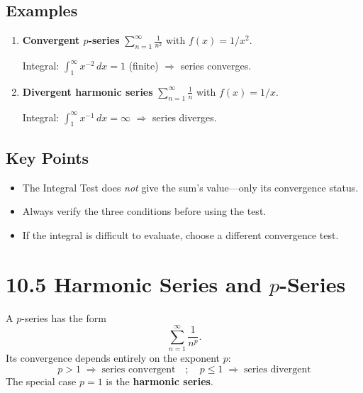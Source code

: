 \documentclass{article}
\begin{document}
\subsection*{Examples}

\begin{enumerate}[label=\textbf{\arabic*.},itemsep=10pt]

  \item \textbf{Convergent \(p\)-series}  
        \(\displaystyle\sum_{n=1}^{\infty}\frac{1}{n^{2}}\)  
        with \(f(x)=1/x^{2}\).

        Integral: \(\displaystyle\int_{1}^{\infty} x^{-2}\,dx = 1\) (finite)  
        \(\Rightarrow\) series converges.

  \item \textbf{Divergent harmonic series}  
        \(\displaystyle\sum_{n=1}^{\infty}\frac{1}{n}\)  
        with \(f(x)=1/x\).

        Integral: \(\displaystyle\int_{1}^{\infty} x^{-1}\,dx = \infty\)  
        \(\Rightarrow\) series diverges.

\end{enumerate}

\subsection*{Key Points}
\begin{itemize}[itemsep=4pt]
  \item The Integral Test does \emph{not} give the sum’s value—only its convergence status.
  \item Always verify the three conditions before using the test.
  \item If the integral is difficult to evaluate, choose a different convergence test.
\end{itemize}


\newpage
\section{10.5 Harmonic Series and \(p\)-Series}

\begin{tcolorbox}[colback=gray!8,colframe=black,title=Big-Idea]
A \(p\)-series has the form
\[
\sum_{n=1}^{\infty} \frac{1}{n^{p}}.
\]
Its convergence depends entirely on the exponent \(p\):
\[
\boxed{\;p>1 \;\Rightarrow\; \text{series convergent}\quad;\quad
       p\le 1 \;\Rightarrow\; \text{series divergent}\;}
\]
The special case \(p=1\) is the \textbf{harmonic series}.
\end{tcolorbox}
\end{document}
